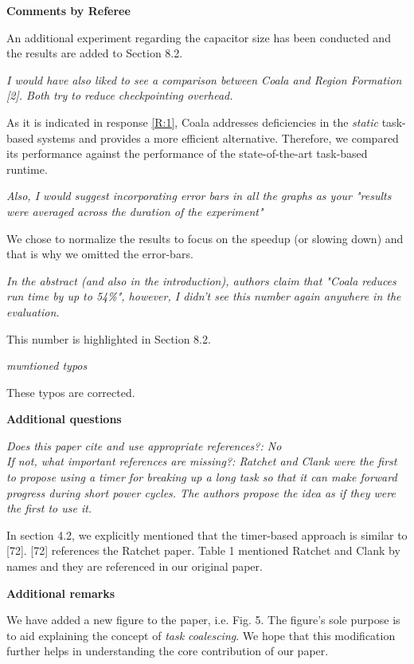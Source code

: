 \documentclass[10pt]{article}
\newcommand{\referee}[1]{
	{\item \color{OliveGreen} \emph{{#1}}}
	\label{R\therefereeCounter:\arabic{enumi}}
}
\newcommand{\response}[1]{{\color{blue} #1}}
\newenvironment{additionalQuestions}{%
\textbf{\large Additional questions}
\begin{enumerate}%
\renewcommand{\labelenumi}{\textbf{[Q:\,\arabic{enumi}]}} %
}{\end{enumerate}}
\newenvironment{editor}{%
\textbf{\large Additional remarks}
\begin{enumerate}%
\renewcommand{\labelenumi}{\textbf{[R:\,\arabic{enumi}]}} %
}{\end{enumerate}}
\newcounter{refereeCounter}
\newenvironment{responses}{%
\refstepcounter{refereeCounter}%
\textbf{\large Comments by Referee \therefereeCounter}
\begin{enumerate}%
\renewcommand{\labelenumi}{\textbf{[C:\,\arabic{enumi}]}} %
}{\end{enumerate}}
\begin{document}
\begin{responses}
\response{An additional experiment regarding the capacitor size has been conducted and the results are added to Section 8.2.}

\referee{I would have also liked to see a comparison between Coala and Region Formation [2]. Both try to reduce checkpointing overhead.}

\response{As it is indicated in response \hyperref[R:1]{[R:1]}, Coala addresses deficiencies in the \emph{static} task-based systems and provides a more efficient alternative. Therefore, we compared its performance against the performance of the state-of-the-art task-based runtime.}

\referee{Also, I would suggest incorporating error bars in all the graphs as your "results were averaged across the duration of the experiment"}

\response{We chose to normalize the results to focus on the speedup (or slowing down) and that is why we omitted the error-bars.}

\referee{In the abstract (and also in the introduction), authors claim that "Coala reduces run time by up to 54\%", however, I didn't see this number again anywhere in the evaluation.}

\response{This number is highlighted in Section 8.2.}



\referee{mwntioned typos}

\response{These typos are corrected.}


\end{responses}


\begin{additionalQuestions}
\referee{Does this paper cite and use appropriate references?: No\\
If not, what important references are missing?: 
Ratchet and Clank were the first to propose using a timer for breaking up a long task so that it can make forward progress during short power cycles.  The authors propose the idea as if they were the first to use it.}

\response{In section 4.2, we explicitly mentioned that the timer-based approach is similar to [72]. [72] references the Ratchet paper. Table 1 mentioned Ratchet and Clank by names and they are referenced in our original paper.}
\end{additionalQuestions}

\begin{editor}
\referee{}
\response{We have added a new figure to the paper, i.e. Fig. 5. The figure's sole purpose is to aid explaining the concept of \textit{task coalescing}.
We hope that this modification further helps in understanding the core contribution of our paper.}
\end{editor}
\end{document}
